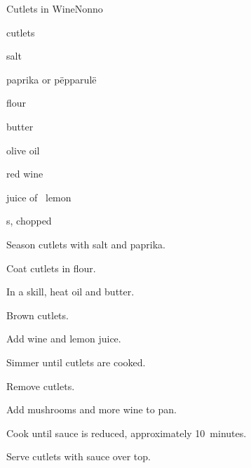\begin{recipe}{Cutlets in Wine}{Nonno}{}

\begin{ingredients}
\item {} cutlets
\item salt
\item paprika or p\"epparul\"e
\item flour
\item butter
\item olive oil
\item red wine
\item juice of \half{}~lemon
\item {}s, chopped
\end{ingredients}

\begin{directions}
\item Season cutlets with salt and paprika.
\item Coat cutlets in flour.
\item In a skill, heat oil and butter.
\item Brown cutlets.
\item Add wine and lemon juice.
\item Simmer until cutlets are cooked.
\item Remove cutlets.
\item Add mushrooms and more wine to pan.
\item Cook until sauce is reduced, approximately 10~minutes.
\item Serve cutlets with sauce over top.
\end{directions}

\end{recipe}
